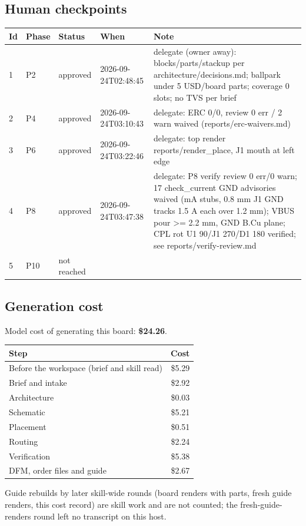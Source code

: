 \documentclass[11pt,a4paper]{article}
\begin{document}
\subsection*{Human checkpoints}
{\small
\begin{longtable}{lllp{2.6cm}p{6.4cm}}
\toprule
\textbf{Id} & \textbf{Phase} & \textbf{Status} & \textbf{When} & \textbf{Note} \\
\midrule
\endhead
1 & P2 & approved & 2026-09-24T02:48:45 & delegate (owner away): blocks/parts/stackup per architecture/decisions.md; ballpark under 5 USD/board parts; coverage 0 slots; no TVS per brief \\
2 & P4 & approved & 2026-09-24T03:10:43 & delegate: ERC 0/0, review 0 err / 2 warn waived (reports/erc-waivers.md) \\
3 & P6 & approved & 2026-09-24T03:22:46 & delegate: top render reports/render\_place, J1 mouth at left edge \\
4 & P8 & approved & 2026-09-24T03:47:38 & delegate: P8 verify review 0 err/0 warn; 17 check\_current GND advisories waived (mA stubs, 0.8 mm J1 GND tracks 1.5 A each over 1.2 mm); VBUS pour \textgreater{}= 2.2 mm, GND B.Cu plane; CPL rot U1 90/J1 270/D1 180 verified; see reports/verify-review.md \\
5 & P10 & not reached &  &  \\
\bottomrule
\end{longtable}
}
\subsection*{Generation cost}
Model cost of generating this board: \textbf{\$24.26}.

{\small
\begin{longtable}{p{10cm}r}
\toprule
\textbf{Step} & \textbf{Cost} \\
\midrule
\endhead
Before the workspace (brief and skill read) & \$5.29 \\
Brief and intake & \$2.92 \\
Architecture & \$0.03 \\
Schematic & \$5.21 \\
Placement & \$0.51 \\
Routing & \$2.24 \\
Verification & \$5.38 \\
DFM, order files and guide & \$2.67 \\
\bottomrule
\end{longtable}
}
Guide rebuilds by later skill-wide rounds (board renders with parts, fresh guide renders, this cost record) are skill work and are not counted; the fresh-guide-renders round left no transcript on this host.
\end{document}
